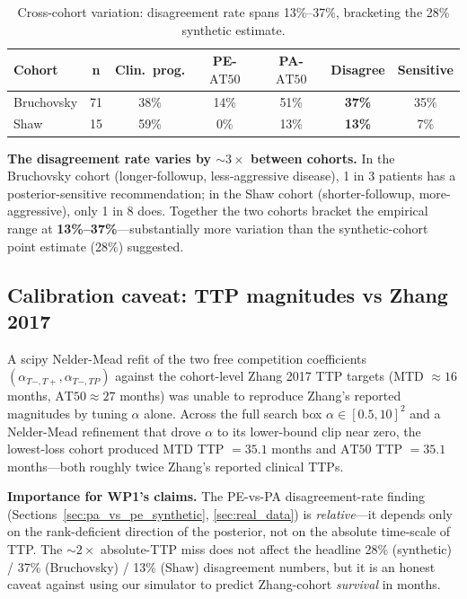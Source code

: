 \documentclass[11pt]{article}
\newcommand{\AT}{\mathrm{AT}}
\newcommand{\Tplus}{T{+}}
\newcommand{\Tminus}{T{-}}
\begin{document}
\begin{table}[h]
\centering
\begin{tabular}{lcccccc}
\toprule
Cohort & n & Clin.\ prog. & PE-$\AT 50$ & PA-$\AT 50$ & Disagree & Sensitive \\
\midrule
Bruchovsky & 71 & 38\% & 14\% & 51\% & \textbf{37\%} & 35\% \\
Shaw & 15 & 59\% & 0\% & 13\% & \textbf{13\%} & 7\% \\
\bottomrule
\end{tabular}
\caption{Cross-cohort variation: disagreement rate spans 13\%--37\%, bracketing
the 28\% synthetic estimate.}
\end{table}

\textbf{The disagreement rate varies by $\sim 3\times$ between cohorts.} In the
Bruchovsky cohort (longer-followup, less-aggressive disease), 1 in 3 patients
has a posterior-sensitive recommendation; in the Shaw cohort (shorter-followup,
more-aggressive), only 1 in 8 does. Together the two cohorts bracket the
empirical range at \textbf{13\%--37\%}---substantially more variation than the
synthetic-cohort point estimate (28\%) suggested.

\subsection{Calibration caveat: TTP magnitudes vs Zhang 2017}

A scipy Nelder-Mead refit of the two free competition coefficients
$(\alpha_{\Tminus,\Tplus}, \alpha_{\Tminus,TP})$ against the cohort-level Zhang
2017 TTP targets (MTD $\approx 16$ months, $\AT 50 \approx 27$ months) was
unable to reproduce Zhang's reported magnitudes by tuning $\alpha$ alone.
Across the full search box $\alpha \in [0.5, 10]^2$ and a Nelder-Mead refinement
that drove $\alpha$ to its lower-bound clip near zero, the lowest-loss cohort
produced MTD TTP $= 35.1$ months and $\AT 50$ TTP $= 35.1$ months---both roughly
twice Zhang's reported clinical TTPs.

\textbf{Importance for WP1's claims.} The PE-vs-PA disagreement-rate finding
(Sections~\ref{sec:pa_vs_pe_synthetic}, \ref{sec:real_data}) is \emph{relative}---it
depends only on the rank-deficient direction of the posterior, not on the
absolute time-scale of TTP. The $\sim 2\times$ absolute-TTP miss does not affect
the headline 28\% (synthetic) / 37\% (Bruchovsky) / 13\% (Shaw) disagreement
numbers, but it is an honest caveat against using our simulator to predict
Zhang-cohort \emph{survival} in months.
\end{document}
